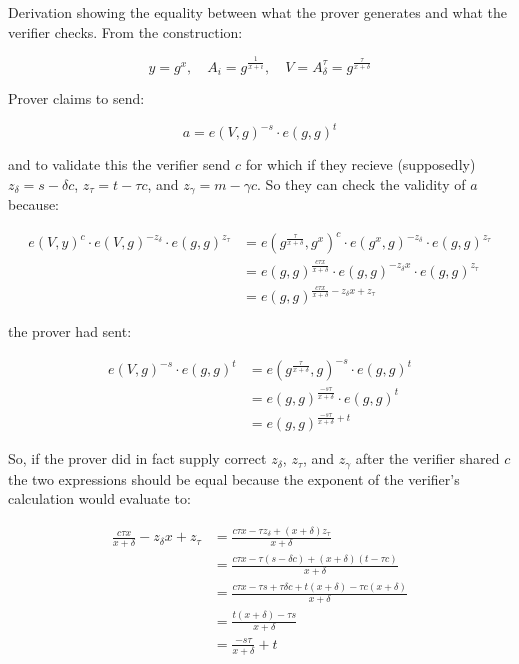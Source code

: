 \documentclass{article}
\begin{document}
\noindent Derivation showing the equality between what the prover generates and
what the verifier checks. From the construction:

\[
    y = g^{x}, \quad A_{i} = g^{\frac{1}{x + i}}, \quad V = A_{\delta}^{\tau} = g^{\frac{\tau}{x + \delta}} 
\]

\noindent Prover claims to send:

\[
    a = e(V, g)^{-s} \cdot e(g, g)^{t}
\]

\noindent and to validate this the verifier send $ c $ for which if they recieve (supposedly)
$ z_{\delta} = s - \delta c $, $ z_{\tau} = t - \tau c $, and
$ z_{\gamma} = m - \gamma c $. So they can check the validity of $ a $ because:

\begin{align*}
    e(V, y)^{c} \cdot e(V, g)^{-z_{\delta}} \cdot e(g, g)^{z_{\tau}} &=
    e \left(g^{\frac{\tau}{x + \delta}}, g^{x} \right)^{c} \cdot e \left(g^{x}, g \right)^{-z_{\delta}} \cdot e(g, g)^{z_{\tau}} \\
    &= e(g, g)^{\frac{c \tau x}{x + \delta}} \cdot e(g, g)^{-z_{\delta} x} \cdot e(g, g)^{z_{\tau}} \\
    &= e(g, g)^{\frac{c \tau x}{x + \delta} - z_{\delta} x + z_{\tau}}
\end{align*}

\noindent the prover had sent:

\begin{align*}
    e(V, g)^{-s} \cdot e(g, g)^{t} &= e \left(g^{\frac{\tau}{x + \delta}}, g \right)^{-s} \cdot e(g, g)^{t} \\
    &= e(g, g)^{\frac{-s \tau}{x + \delta}} \cdot e(g, g)^{t} \\
    &= e(g, g)^{\frac{-s \tau}{x + \delta} + t}
\end{align*}

\noindent So, if the prover did in fact supply correct $ z_{\delta} $,
$ z_{\tau} $, and $ z_{\gamma} $ after the verifier shared $ c $ the two
expressions should be equal because the exponent of the verifier's calculation
would evaluate to:

\begin{align*}
    \frac{c \tau x}{x + \delta} - z_{\delta} x + z_{\tau} &= \frac{c \tau x - \tau z_{\delta} + (x + \delta) z_{\tau}}{x + \delta} \\
    &= \frac{c \tau x - \tau (s - \delta c) + (x + \delta) (t - \tau c)}{x + \delta} \\
    &= \frac{c \tau x - \tau s + \tau \delta c + t (x + \delta) - \tau c (x + \delta)}{x + \delta} \\
    &= \frac{t(x + \delta) - \tau s}{x + \delta} \\
    &= \frac{-s \tau}{x + \delta} + t
\end{align*}
\end{document}
